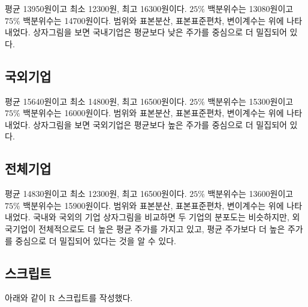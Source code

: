 평균 13950원이고 최소 12300원, 최고 16300원이다.
$25\%$ 백분위수는 13080원이고 $75\%$ 백분위수는 14700원이다.
범위와 표본분산, 표본표준편차, 변이계수는 위에 나타내었다.
상자그림을 보면 국내기업은 평균보다 낮은 주가를 중심으로 더 밀집되어 있다.

\subsection{국외기업}

평균 15640원이고 최소 14800원, 최고 16500원이다.
$25\%$ 백분위수는 15300원이고 $75\%$ 백분위수는 16000원이다.
범위와 표본분산, 표본표준편차, 변이계수는 위에 나타내었다.
상자그림을 보면 국외기업은 평균보다 높은 주가를 중심으로 더 밀집되어 있다.

\subsection{전체기업}

평균 14830원이고 최소 12300원, 최고 16500원이다.
$25\%$ 백분위수는 13600원이고 $75\%$ 백분위수는 15900원이다.
범위와 표본분산, 표본표준편차, 변이계수는 위에 나타내었다.
국내와 국외의 기업 상자그림을 비교하면 두 기업의 분포도는 비슷하지만,
외국기업이 전체적으로도 더 높은 평균 주가를 가지고 있고, 평균 주가보다
더 높은 주가를 중심으로 더 밀집되어 있다는 것을 알 수 있다.


\subsection{스크립트}
아래와 같이 R 스크립트를 작성했다.

